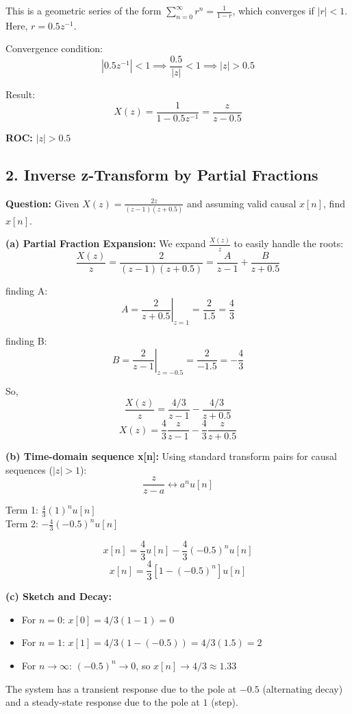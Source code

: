 \documentclass[11pt, a4paper]{article}
\begin{document}
This is a geometric series of the form $\sum_{n=0}^{\infty} r^n = \frac{1}{1-r}$, which converges if $|r| < 1$.
Here, $r = 0.5z^{-1}$.

Convergence condition:
$$|0.5 z^{-1}| < 1 \implies \frac{0.5}{|z|} < 1 \implies |z| > 0.5$$

Result:
$$X(z) = \frac{1}{1 - 0.5z^{-1}} = \frac{z}{z - 0.5}$$

\textbf{ROC:} $|z| > 0.5$

\subsection{2. Inverse z-Transform by Partial Fractions}
\textbf{Question:} Given $X(z) = \frac{2z}{(z-1)(z+0.5)}$ and assuming valid causal $x[n]$, find $x[n]$.

\textbf{(a) Partial Fraction Expansion:}
We expand $\frac{X(z)}{z}$ to easily handle the roots:
$$\frac{X(z)}{z} = \frac{2}{(z-1)(z+0.5)} = \frac{A}{z-1} + \frac{B}{z+0.5}$$

finding A:
$$A = \left. \frac{2}{z+0.5} \right|_{z=1} = \frac{2}{1.5} = \frac{4}{3}$$

finding B:
$$B = \left. \frac{2}{z-1} \right|_{z=-0.5} = \frac{2}{-1.5} = -\frac{4}{3}$$

So,
$$\frac{X(z)}{z} = \frac{4/3}{z-1} - \frac{4/3}{z+0.5}$$
$$X(z) = \frac{4}{3} \frac{z}{z-1} - \frac{4}{3} \frac{z}{z+0.5}$$

\textbf{(b) Time-domain sequence x[n]:}
Using standard transform pairs for causal sequences ($|z| > 1$):
$$\frac{z}{z-a} \longleftrightarrow a^n u[n]$$

Term 1: $\frac{4}{3} (1)^n u[n]$ \\
Term 2: $-\frac{4}{3} (-0.5)^n u[n]$

$$x[n] = \frac{4}{3} u[n] - \frac{4}{3} (-0.5)^n u[n]$$
$$x[n] = \frac{4}{3} [1 - (-0.5)^n] u[n]$$

\textbf{(c) Sketch and Decay:}
\begin{itemize}
    \item For $n=0$: $x[0] = 4/3(1 - 1) = 0$
    \item For $n=1$: $x[1] = 4/3(1 - (-0.5)) = 4/3(1.5) = 2$
    \item For $n \to \infty$: $(-0.5)^n \to 0$, so $x[n] \to 4/3 \approx 1.33$
\end{itemize}

The system has a transient response due to the pole at $-0.5$ (alternating decay) and a steady-state response due to the pole at $1$ (step).
\end{document}
